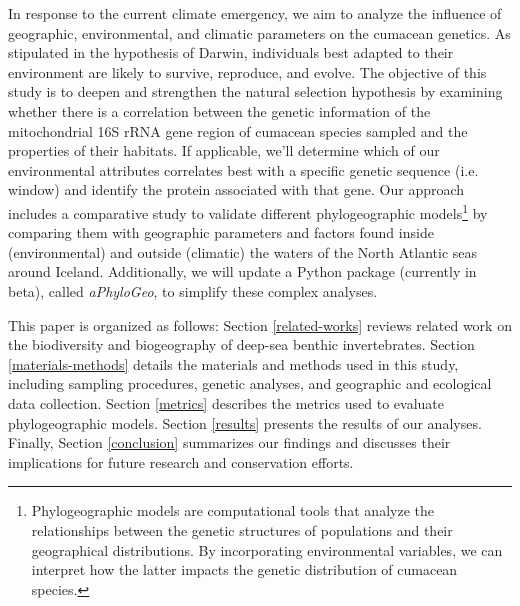 In response to the current climate emergency, we aim to analyze the influence of geographic, environmental, and climatic parameters on the cumacean genetics. As stipulated in the hypothesis of Darwin, individuals best adapted to their environment are likely to survive, reproduce, and evolve. The objective of this study is to deepen and strengthen the natural selection hypothesis by examining whether there is a correlation between the genetic information of the mitochondrial 16S rRNA gene region of cumacean species sampled and the properties of their habitats. If applicable, we'll determine which of our environmental attributes correlates best with a specific genetic sequence (i.e. window) and identify the protein associated with that gene. Our approach includes a comparative study to validate different {phylogeographic models}\footnote{Phylogeographic models are computational tools that analyze the relationships between the genetic structures of populations and their geographical distributions. By incorporating environmental variables, we can interpret how the latter impacts the genetic distribution of cumacean species.} by comparing them with geographic parameters and factors found inside (environmental) and outside (climatic) the waters of the North Atlantic seas around Iceland. Additionally, we will update a Python package (currently in beta), called \textit{aPhyloGeo}, to simplify these complex analyses.

This paper is organized as follows: Section \autoref{related-works} reviews related work on the biodiversity and biogeography of deep-sea benthic invertebrates. Section \autoref{materials-methods} details the materials and methods used in this study, including sampling procedures, genetic analyses, and geographic and ecological data collection. Section \autoref{metrics} describes the metrics used to evaluate phylogeographic models. Section \autoref{results} presents the results of our analyses. Finally, Section \autoref{conclusion} summarizes our findings and discusses their implications for future research and conservation efforts.

